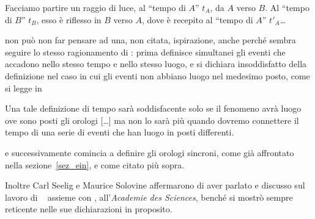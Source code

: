\begin{citaz}
  Facciamo partire un raggio di luce, al ``tempo di $A$'' $t_A$, da
  $A$ verso $B$. Al ``tempo di $B$'' $t_B$, esso \`e riflesso in $B$
  verso $A$, dove \`e recepito al ``tempo di $A$'' $t'_A$\ldots
\end{citaz}
non pu\`o non far pensare ad una, non citata, ispirazione, anche
perch\'e \ein{} sembra seguire lo stesso ragionamento di \poin: prima
definisce simultanei gli eventi che accadono nello stesso tempo e nello
stesso luogo, e si dichiara insoddisfatto della definizione nel caso in
cui gli
eventi non abbiano luogo nel medesimo posto, come si legge
in~\cite{alberto}
\begin{citaz}
 Una tale definizione di tempo sar\`a soddisfacente solo se il fenomeno
 avr\`a luogo ove sono posti gli orologi [\ldots] ma non lo sar\`a pi\`u
 quando dovremo connettere il tempo di una serie di eventi che han luogo
 in posti differenti.
\end{citaz}
e successivamente comincia a definire gli orologi sincroni, come gi\`a
affrontato nella sezione~\ref{sez_ein}, e come citato pi\`u sopra.

Inoltre Carl Seelig e Maurice Solovine affermarono di
aver parlato e discusso sul lavoro di \poin{}~\cite{carro4} assieme con \ein,
all'\emph{Academie des Sciences}, bench\'e \ein{} si mostr\`o sempre
reticente nelle sue dichiarazioni in proposito.


